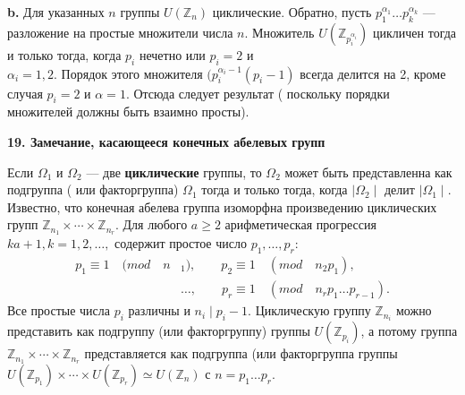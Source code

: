 \documentclass{mai_book}
\begin{document}
\indent \textbf{b.} \quad Для указанных $n$ группы $U(\mathbb Z_n)$ циклические. Обратно, пусть $p_1^{\alpha_1}\ldots p_k^{\alpha_k}$ --- разложение на простые множители числа $n$. Множитель $U(\mathbb Z_{p_i^{\alpha_i}})$ цикличен тогда и только тогда, когда $p_i$ нечетно или $p_i = 2$ и \\$\alpha_i = 1, 2$. Порядок этого множителя $(p_i^{{\alpha_i} - 1}(p_i - 1)$ всегда делится на 2, кроме случая $p_i = 2$ и $\alpha = 1$. Отсюда следует результат ( поскольку порядки множителей должны быть взаимно просты).

\bigskip
\noindent \textbf{19. Замечание, касающееся конечных абелевых групп}

\medskip
\indent Если $\Omega_1$ и $\Omega_2$ --- две \textbf{циклические} группы, то $\Omega_2$ может быть представленна как подгруппа ( или факторгруппа) $\Omega_1$ тогда и только тогда, когда $\mid\Omega_2\mid$ делит $\mid\Omega_1\mid$. Известно, что конечная абелева группа изоморфна произведению циклических групп $\mathbb Z_{n_1} \times \cdots \times \mathbb Z_{n_r}$. Для любого $a \geqslant 2$ арифметическая прогрессия $ka+1, k=1, 2, \ldots,$ содержит простое число $p_1, \ldots, p_r$: 
\begin{align*}
p_1 \equiv 1\quad (mod\quad n&_1),\qquad p_2 \equiv 1 \quad (mod \quad n_2p_1), \\
&\ldots ,\qquad p_r \equiv 1 \quad(mod\quad n_rp_1\ldots p_{r-1}).
\end{align*} 
\noindent Все простые числа $p_i$ различны и $n_i\mid p_i-1$. Циклическую группу $\mathbb Z_{n_i}$ можно представить как подгруппу (или факторгруппу) группы $U(\mathbb Z_{p_i})$, а потому группа $\mathbb Z_{n_1} \times \cdots \times \mathbb Z_{n_r}$ представляется как подгруппа (или  факторгруппа группы $U(\mathbb Z_{p_1}) \times \cdots \times U(\mathbb Z_{p_r}) \simeq U(\mathbb Z_n)$ с $n = p_1\ldots p_r$.
\end{document}
